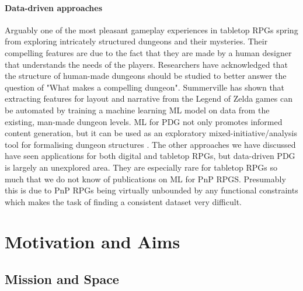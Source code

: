 \documentclass{UoYCSproject}
\begin{document}
\subsubsection{Data-driven approaches}
\label{subsub:DataDriven}
 Arguably one of the most pleasant gameplay experiences in tabletop RPGs spring from exploring intricately structured dungeons and their mysteries. Their compelling features are due to the fact that they are made by a human designer that understands the needs of the players. Researchers have acknowledged that the structure of human-made dungeons should be studied to better answer the question of "What makes a compelling dungeon". Summerville \parencite{SummervilleLearningOfZelda} has shown that extracting features for layout and narrative from the Legend of Zelda games can be automated by training a machine learning ML model on data from the existing, man-made dungeon levels. ML for PDG not only promotes informed content generation, but it can be used as an exploratory mixed-initiative/analysis tool for formalising dungeon structures \parencite{SummervillePCGML}. The other approaches we have discussed have seen applications for both digital and tabletop RPGs, but data-driven PDG is largely an unexplored area. They are especially rare for tabletop RPGs so much that we do not know of publications on ML for PnP RPGS. Presumably this is due to PnP RPGs being virtually unbounded by any functional constraints which makes the task of finding a consistent dataset very difficult.

\chapter{Motivation and Aims}

\section{Mission and Space}
\end{document}
